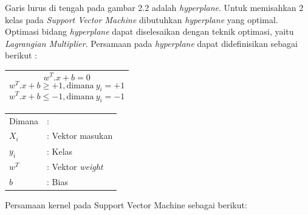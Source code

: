 Garis lurus di tengah pada gambar 2.2 adalah \textit{hyperplane}. 
Untuk memisahkan 2 kelas pada \textit{Support Vector Machine} 
dibutuhkan \textit{hyperplane }yang optimal. Optimasi bidang \textit{
	hyperplane }dapat diselesaikan dengan teknik optimasi, yaitu \textit{
	Lagrangian Multiplier}. Persamaan pada \textit{hyperplane }dapat 
didefinisikan sebagai berikut \cite{16}:
\begin{table}[H]
	\small
	\begin{adjustbox}{width=1\textwidth}
	\begin{tabular}{|p{13.55cm}|}
		\hline
		\begin{equation}
		w^T.x+b=0
		\end{equation}
		\begin{equation}
		w^T.x+b\geq+1,\textrm{dimana}\ y_i=+1
		\end{equation}
		\begin{equation}
		w^T.x+b \leq -1,\textrm{dimana}\ y_i=-1
		\end{equation}\\
		\hline
	\end{tabular}
	\end{adjustbox}
\end{table}
\vspace{-0.5cm}	
\begin{table}[H]
	\centering
	\begin{tabular}{ll}
		Dimana & :\\
		$X_i$ &: Vektor masukan\\
		$y_i$ &: Kelas\\
		$w^T$ &: Vektor \textit{weight}\\
		$b$ &: Bias
	\end{tabular}
\end{table}
\vspace{-0.8cm}
\noindent Persamaan kernel pada Support Vector Machine sebagai berikut:

